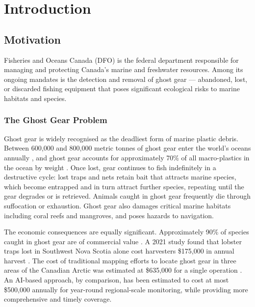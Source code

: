 \documentclass[12pt, letterpaper]{article}
\begin{document}
\newpage

\tableofcontents
\newpage

\section{Introduction}

\subsection{Motivation}

Fisheries and Oceans Canada (DFO) is the federal department responsible for managing and
protecting Canada's marine and freshwater resources. Among its ongoing mandates is the
detection and removal of ghost gear --- abandoned, lost, or discarded fishing equipment
that poses significant ecological risks to marine habitats and species.

\subsubsection*{The Ghost Gear Problem}

Ghost gear is widely recognised as the deadliest form of marine plastic debris.
Between 600,000 and 800,000 metric tonnes of ghost gear enter the world's oceans
annually \cite{canadiangeographic2021}, and ghost gear accounts for approximately
70\% of all macro-plastics in the ocean by weight \cite{ifaw2022}. Once lost, gear
continues to fish indefinitely in a destructive cycle: lost traps and nets retain
bait that attracts marine species, which become entrapped and in turn attract further
species, repeating until the gear degrades or is retrieved. Animals caught in ghost
gear frequently die through suffocation or exhaustion. Ghost gear also damages
critical marine habitats including coral reefs and mangroves, and poses hazards to
navigation.

The economic consequences are equally significant. Approximately 90\% of species
caught in ghost gear are of commercial value \cite{ifaw2022}. A 2021 study found
that lobster traps lost in Southwest Nova Scotia alone cost harvesters \$175,000 in
annual harvest \cite{canadiangeographic2021}. The cost of traditional mapping efforts
to locate ghost gear in three areas of the Canadian Arctic was estimated at \$635,000
for a single operation \cite{dfopsdc2023}. An AI-based approach, by comparison, has
been estimated to cost at most \$500,000 annually for year-round regional-scale
monitoring, while providing more comprehensive and timely coverage.
\end{document}
